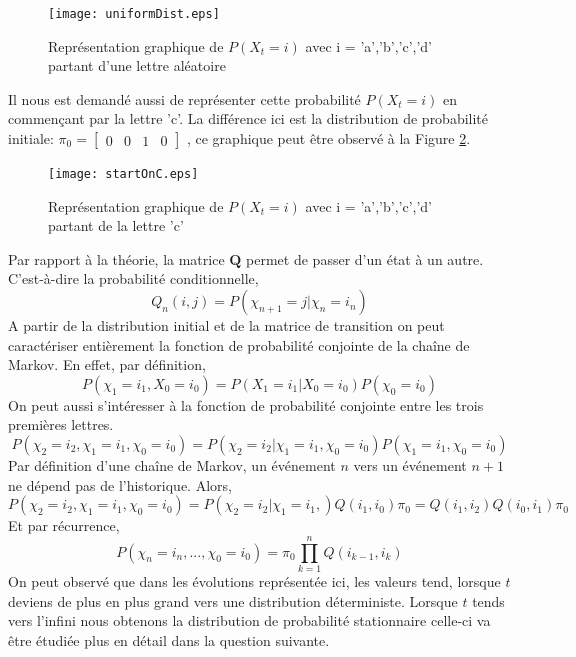 \documentclass[12pt]{article}
\begin{document}
 \begin{figure}[!h]
      \centering
      \texttt{[image: uniformDist.eps]}
       \caption{Représentation graphique de $P(X_t = i)$ avec i = 'a','b','c','d' partant d'une lettre aléatoire}
       \label{ProbgraphBegin_random}

  \end{figure}
 
Il nous est demandé aussi de représenter cette probabilité $P(X_t = i)$  en commençant par la lettre 'c'. La différence ici est la distribution de probabilité initiale: 
$\pi_0 = \begin{bmatrix}
0 & 0 & 1 & 0
\end{bmatrix}$
, ce graphique peut être observé à la Figure \ref{ProbgraphBegin_c}.


 \begin{figure}[!h]
      \centering
      \texttt{[image: startOnC.eps]}
       \caption{Représentation graphique de $P(X_t = i)$ avec i = 'a','b','c','d' partant de la lettre 'c'}
       \label{ProbgraphBegin_c}

  \end{figure} 
  
  
Par rapport à la théorie, la matrice $\textbf{Q}$ permet de passer d'un état à un autre. C'est-à-dire la probabilité conditionnelle, $$Q_n(i,j) = P(\chi_{n+1} = j|\chi_n = i_n)$$
A partir de la distribution initial et de la matrice de transition on peut caractériser entièrement la fonction de probabilité conjointe de la chaîne de Markov. En effet, par définition,
$$P(\chi_1 = i_1,X_0 = i_0) = P(X_1 = i_1|X_0 = i_0)P(\chi_0 = i_0)$$
On peut aussi s’intéresser à la fonction de probabilité conjointe entre les trois premières lettres.
$$P(\chi_2 = i_2,\chi_1 = i_1,\chi_0 = i_0) = P(\chi_2 = i_2|\chi_1 = i_1,\chi_0 = i_0)P(\chi_1 = i_1,\chi_0 = i_0)$$
Par définition d'une chaîne de Markov, un événement $n$ vers un événement $n+1$ ne dépend pas de l'historique. Alors,
$$P(\chi_2 = i_2,\chi_1 = i_1,\chi_0 = i_0) = P(\chi_2 = i_2|\chi_1 = i_1,)Q(i_1,i_0)\pi_0 = Q(i_1,i_2)Q(i_0,i_1)\pi_0$$
Et par récurrence,
$$P(\chi_n = i_n, ..., \chi_0 = i_0) = \pi_0 \prod_{k=1}^n Q(i_{k-1},i_k)$$
On peut observé que dans les évolutions représentée ici, les valeurs tend, lorsque $t$ deviens de plus en plus grand vers une distribution déterministe. Lorsque $t$ tends vers l’infini nous obtenons la distribution de probabilité stationnaire celle-ci va être étudiée plus en détail dans la question suivante.
\end{document}

